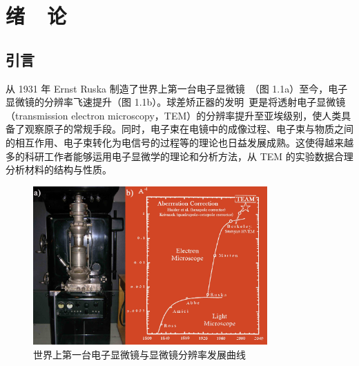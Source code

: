 
\chapter{绪~~论}
\section{引言}

从 1931 年 Ernst Ruska 制造了世界上第一台电子显微镜~\cite{Knoll1932}（图 1.1a）至今，电子显微镜的分辨率飞速提升（图 1.1b）。球差矫正器的发明~\cite{Haider1997}更是将透射电子显微镜（transmission electron microscopy，TEM）的分辨率提升至亚埃级别，使人类具备了观察原子的常规手段。同时，电子束在电镜中的成像过程、电子束与物质之间的相互作用、电子束转化为电信号的过程等的理论也日益发展成熟。这使得越来越多的科研工作者能够运用电子显微学的理论和分析方法，从 TEM 的实验数据合理分析材料的结构与性质。

\begin{figure}[htbp]
	\vspace{\baselineskip}
	\centering
	\includegraphics[width=0.8\textwidth]{../1.1/11}
	\caption{世界上第一台电子显微镜与显微镜分辨率发展曲线}\label{fig:11}
	\song{}
\end{figure}

